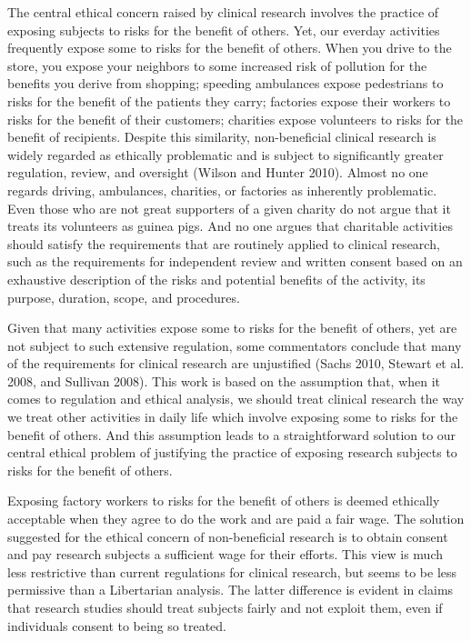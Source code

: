 \documentclass[12p]{article}
\begin{document}
The central ethical concern raised by clinical research involves the practice of exposing subjects to risks for the benefit of others. Yet, our everday activities frequently expose some to risks for the benefit of others. When you drive to the store, you expose your neighbors to some increased risk of pollution for the benefits you derive from shopping; speeding ambulances expose pedestrians to risks for the benefit of the patients they carry; factories expose their workers to risks for the benefit of their customers; charities expose volunteers to risks for the benefit of recipients. Despite this similarity, non-beneficial clinical research is widely regarded as ethically problematic and is subject to significantly greater regulation, review, and oversight (Wilson and Hunter 2010). Almost no one regards driving, ambulances, charities, or factories as inherently problematic. Even those who are not great supporters of a given charity do not argue that it treats its volunteers as guinea pigs. And no one argues that charitable activities should satisfy the requirements that are routinely applied to clinical research, such as the requirements for independent review and written consent based on an exhaustive description of the risks and potential benefits of the activity, its purpose, duration, scope, and procedures.

Given that many activities expose some to risks for the benefit of others, yet are not subject to such extensive regulation, some commentators conclude that many of the requirements for clinical research are unjustified (Sachs 2010, Stewart et al. 2008, and Sullivan 2008). This work is based on the assumption that, when it comes to regulation and ethical analysis, we should treat clinical research the way we treat other activities in daily life which involve exposing some to risks for the benefit of others. And this assumption leads to a straightforward solution to our central ethical problem of justifying the practice of exposing research subjects to risks for the benefit of others.

Exposing factory workers to risks for the benefit of others is deemed ethically acceptable when they agree to do the work and are paid a fair wage. The solution suggested for the ethical concern of non-beneficial research is to obtain consent and pay research subjects a sufficient wage for their efforts. This view is much less restrictive than current regulations for clinical research, but seems to be less permissive than a Libertarian analysis. The latter difference is evident in claims that research studies should treat subjects fairly and not exploit them, even if individuals consent to being so treated.
\end{document}

